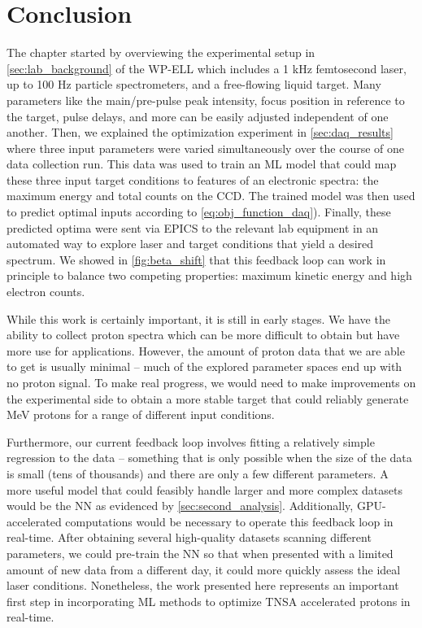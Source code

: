\section{Conclusion}

The chapter started by overviewing the experimental setup in \autoref{sec:lab_background} of the \gls{WP-ELL} which includes a 1 kHz femtosecond laser, up to 100 Hz particle spectrometers, and a free-flowing liquid target. Many parameters like the main/pre-pulse peak intensity, focus position in reference to the target, pulse delays, and more can be easily adjusted independent of one another. Then, we explained the optimization experiment in \autoref{sec:daq_results} where three input parameters were varied simultaneously over the course of one data collection run. This data was used to train an \gls{ML} model that could map these three input target conditions to features of an electronic spectra: the maximum energy and total counts on the \gls{CCD}. The trained model was then used to predict optimal inputs according to \autoref{eq:obj_function_daq}). Finally, these predicted optima were sent via \gls{EPICS} to the relevant lab equipment in an automated way to explore laser and target conditions that yield a desired spectrum. We showed in \autoref{fig:beta_shift} that this feedback loop can work in principle to balance two competing properties: maximum kinetic energy and high electron counts. 

While this work is certainly important, it is still in early stages. We have the ability to collect proton spectra which can be more difficult to obtain but have more use for applications. However, the amount of proton data that we are able to get is usually minimal -- much of the explored parameter spaces end up with no proton signal. To make real progress, we would need to make improvements on the experimental side to obtain a more stable target that could reliably generate MeV protons for a range of different input conditions.

Furthermore, our current feedback loop involves fitting a relatively simple regression to the data -- something that is only possible when the size of the data is small (tens of thousands) and there are only a few different parameters. A more useful model that could feasibly handle larger and more complex datasets would be the \gls{NN} as evidenced by \autoref{sec:second_analysis}. Additionally, \gls{GPU}-accelerated computations would be necessary to operate this feedback loop in real-time. After obtaining several high-quality datasets scanning different parameters, we could pre-train the \gls{NN} so that when presented with a limited amount of new data from a different day, it could more quickly assess the ideal laser conditions. Nonetheless, the work presented here represents an important first step in incorporating \gls{ML} methods to optimize \gls{TNSA} accelerated protons in real-time. 